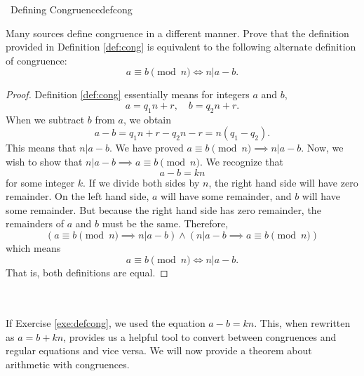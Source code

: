     \begin{exercise}{\Difficulty\,\Difficulty\,\,Defining Congruence}{defcong}
    
        Many sources define congruence in a different manner. Prove that the definition provided in Definition \ref{def:cong} is equivalent to the following alternate definition of congruence:
        \begin{equation*}
            a\equiv b \pmod n \iff n|a-b.
        \end{equation*}
        \begin{proof}
            Definition \ref{def:cong} essentially means for integers \(a\) and \(b\), 
            \begin{equation*}
                a=q_1n+r, \quad b=q_2n+r.
            \end{equation*}
            When we subtract \(b\) from \(a\), we obtain
            \begin{equation*}
                a-b=q_1n+r-q_2n-r=n(q_1-q_2).
            \end{equation*}
            This means that \(n|a-b\). We have proved \(a\equiv b \pmod n \implies n|a-b\). Now, we wish to show that \(n|a-b\implies a\equiv b\pmod n\). We recognize that 
            \begin{equation*}
                a-b=kn
            \end{equation*}
            for some integer \(k\). If we divide both sides by \(n\), the right hand side will have zero remainder. On the left hand side, \(a\) will have some remainder, and \(b\) will have some remainder. But because the right hand side has zero remainder, the remainders of \(a\) and \(b\) must be the same. Therefore, 
            \begin{equation*}
                (a\equiv b \pmod n \implies n|a-b)\wedge(n|a-b\implies a\equiv b\pmod n)
            \end{equation*}
            which means
            \begin{equation*}
                a\equiv b \pmod n \iff n|a-b.
            \end{equation*}
            That is, both definitions are equal.
        \end{proof}
    
    \end{exercise}
    \vphantom
    \\
    \\
    If Exercise \ref{exe:defcong}, we used the equation \(a-b=kn\). This, when rewritten as \(a=b+kn\), provides us a helpful tool to convert between congruences and regular equations and vice versa. We will now provide a theorem about arithmetic with congruences.
